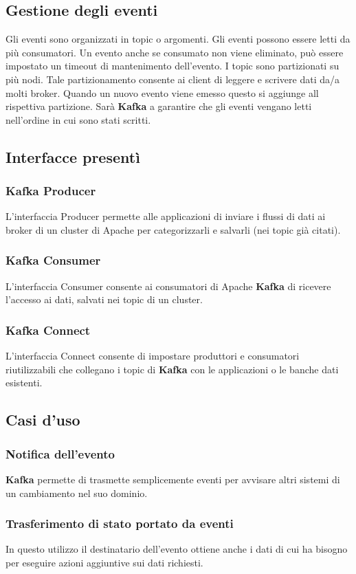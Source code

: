 \documentclass{article}
\begin{document}
\subsection{Gestione degli eventi}
Gli eventi sono organizzati in topic o argomenti. Gli eventi possono essere letti da più consumatori. 
Un evento anche se consumato non viene eliminato, può essere impostato un timeout di mantenimento dell'evento.
I topic sono partizionati su più nodi. Tale partizionamento consente ai client di leggere e scrivere dati da/a molti broker. Quando un nuovo evento viene emesso questo si aggiunge all rispettiva partizione. Sarà \textbf{\textbf{Kafka}} a garantire che gli eventi vengano letti nell'ordine in cui sono stati scritti.
\subsection{Interfacce presentì}
\subsubsection{\textbf{Kafka} Producer}
L’interfaccia Producer permette alle applicazioni di inviare i flussi di dati ai broker di un cluster di Apache per categorizzarli e salvarli (nei topic già citati).
\subsubsection{\textbf{Kafka} Consumer}
L’interfaccia Consumer consente ai consumatori di Apache \textbf{Kafka} di  ricevere l’accesso ai dati, salvati nei topic di un cluster.
 \subsubsection{\textbf{Kafka} Connect}
    L’interfaccia Connect  consente di impostare produttori e consumatori riutilizzabili che collegano i topic di \textbf{Kafka} con le applicazioni o le banche dati esistenti.
\subsection{Casi d'uso}
\subsubsection{Notifica dell'evento}
\textbf{Kafka} permette di trasmette semplicemente eventi per avvisare altri sistemi di un cambiamento nel suo dominio.
\subsubsection{Trasferimento di stato portato da eventi}
In questo utilizzo il destinatario dell'evento ottiene anche i dati di cui ha bisogno per eseguire azioni aggiuntive sui dati richiesti.
\end{document}

